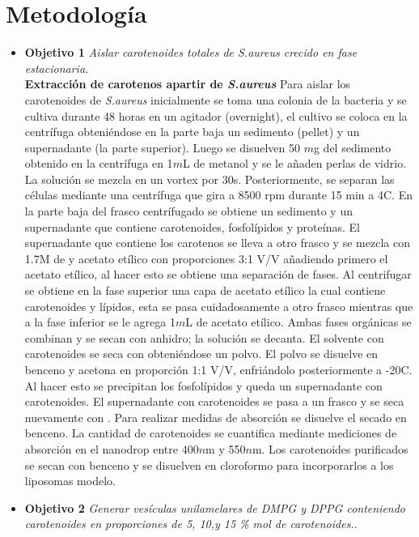 \documentclass[12pt]{article}
\begin{document}
\section{Metodolog\'ia}
\begin{itemize}
    \item \textbf{Objetivo 1} \textit{Aislar carotenoides totales de \textit{S.aureus} crecido en fase estacionaria.}\\
    
    \textbf{Extracción de carotenos apartir de \textit{S.aureus}} Para aislar los carotenoides de \textit{S.aureus} inicialmente se toma una colonia de la bacteria y se cultiva durante 48 horas en un agitador (overnight), el cultivo se coloca en la centrífuga obteniéndose en la parte baja un sedimento (pellet) y un supernadante (la parte superior). Luego se disuelven 50 $m$g del sedimento obtenido en la centrífuga en 1$m$L de metanol y se le añaden perlas de vidrio. La solución se mezcla en un vortex por 30s.  Posteriormente, se separan las células mediante una centrífuga que gira a 8500 rpm durante 15 min a 4\textdegree C. En la parte baja del frasco centrífugado se obtiene un sedimento y un supernadante que contiene carotenoides, fosfolípidos y proteínas. El supernadante que contiene los carotenos se lleva a otro frasco y se mezcla con 1.7M de  y acetato etílico con proporciones 3:1 V/V añadiendo primero el acetato etílico, al hacer esto se obtiene una separación de fases. Al centrifugar se obtiene en la fase superior una capa de acetato etílico la cual contiene carotenoides y lípidos, esta se pasa cuidadosamente a otro frasco mientras que a la fase inferior se le agrega 1$m$L de acetato etílico. Ambas fases orgánicas se combinan y se secan con  anhidro; la solución se decanta. El solvente con carotenoides se seca con  obteniéndose un polvo. El polvo se disuelve en benceno y acetona en proporción 1:1 V/V, enfriándolo posteriormente a -20\textdegree C. Al hacer esto se precipitan los fosfolípidos y queda un supernadante con carotenoides. El supernadante con carotenoides se pasa a un frasco y se seca nuevamente con . Para realizar medidas de absorción se disuelve el secado en benceno. La cantidad de carotenoides se cuantifica mediante mediciones de absorción en el nanodrop entre 400$n$m y 550$n$m. Los carotenoides purificados se secan con benceno y se disuelven en cloroformo para incorporarlos a los liposomas modelo.
    
    \item \textbf{Objetivo 2} \textit{Generar vesículas unilamelares de DMPG y DPPG conteniendo carotenoides en proporciones de 5, 10,y 15 \% mol de carotenoides.}.\\
    

\end{itemize}
\end{document}

